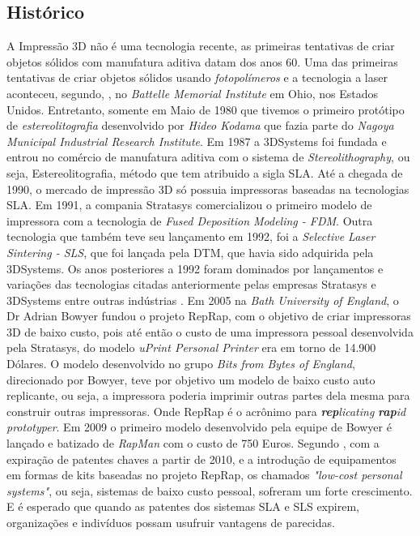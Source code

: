 \subsection{Histórico}
A Impressão 3D não é uma tecnologia recente, as primeiras tentativas de criar objetos
sólidos com manufatura aditiva datam dos anos 60.
Uma das primeiras tentativas de criar objetos sólidos usando \textit{fotopolímeros} e a tecnologia a laser
aconteceu, segundo, \citet{terry2016}, no \textit{Battelle Memorial Institute} em Ohio, nos Estados Unidos.
Entretanto, somente em Maio de 1980 que tivemos o primeiro protótipo de \textit{estereolitografia}
desenvolvido por \textit{Hideo Kodama} que fazia parte do \textit{Nagoya Municipal Industrial Research Institute}.
Em 1987 a 3DSystems foi fundada e entrou no comércio de manufatura aditiva com o
sistema de \textit{Stereolithography}, ou seja, Estereolitografia, método que tem
atribuido a sigla SLA. Até a chegada de 1990, o mercado de impressão 3D só possuia
impressoras baseadas na tecnologias SLA. Em 1991, a compania Stratasys comercializou
o primeiro modelo de impressora
com a tecnologia de \textit{Fused Deposition Modeling - FDM}. Outra tecnologia
que também teve seu lançamento em 1992, foi a \textit{Selective Laser Sintering - SLS},
que foi lançada pela DTM, que havia sido adquirida pela 3DSystems. Os anos posteriores a 1992
foram dominados por lançamentos e variações das tecnologias citadas anteriormente
pelas empresas Stratasys e 3DSystems entre outras indústrias \citet{terry2016}.
Em 2005 na \textit{Bath University of England}, o Dr Adrian Bowyer fundou o projeto
RepRap, com o objetivo de criar impressoras 3D de baixo custo,
pois até então o custo de uma impressora pessoal desenvolvida pela Stratasys, do
modelo \textit{uPrint Personal Printer} era em torno de 14.900 Dólares\citet{terry2016}.
O modelo desenvolvido no grupo \textit{Bits from Bytes of England}, direcionado
por Bowyer, teve por objetivo um modelo de baixo custo auto replicante,
ou seja, a impressora poderia imprimir outras partes dela mesma para construir
outras impressoras. Onde RepRap é o acrônimo para
\textit{\textbf{rep}licating} \textit{\textbf{rap}id} \textit{prototyper}. Em 2009
o primeiro modelo desenvolvido pela equipe de Bowyer é lançado e batizado de \textit{RapMan}
com o custo de 750 Euros.
Segundo \citet{terry2016}, com a expiração de patentes chaves a partir de 2010, e a
introdução de equipamentos em formas de kits baseadas no projeto RepRap, os chamados
 \textit{"low-cost personal systems"}, ou seja, sistemas de baixo custo pessoal, sofreram
um forte crescimento. E é esperado que quando as patentes dos sistemas SLA e SLS expirem,
organizações e indivíduos possam usufruir vantagens de parecidas.

